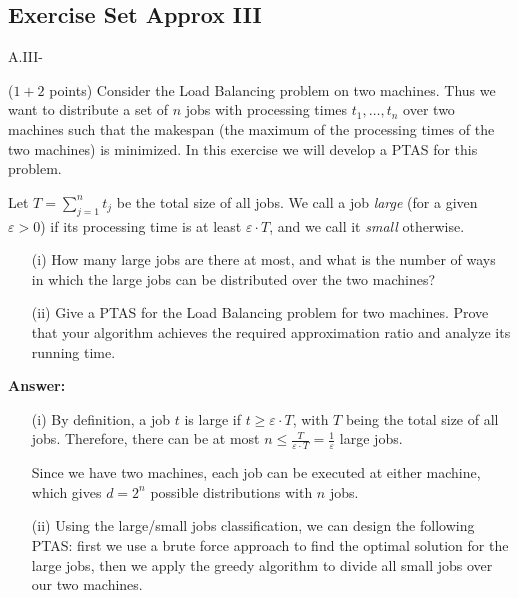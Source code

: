 \documentclass{article}
\newcommand{\loadb}{{\sc Load Balancing}\xspace}
\newcommand{\eps}{\varepsilon}
\renewcommand{\leq}{\leqslant}
\renewcommand{\geq}{\geqslant}
\newcounter{rcounter}
\newenvironment{rlist}%
{\begin{list}{\setnr-\arabic{rcounter}}{\usecounter{rcounter}}}{\end{list}}
\begin{document}
    \renewcommand{\setnr}{A.III}
    \subsection*{Exercise Set Approx III}
    \begin{rlist}
        \item ($1+2$ points)
        Consider the \loadb problem on two machines.  Thus we want to distribute a set of $n$ jobs with processing times $t_1,\ldots,t_n$ over two machines such that the makespan (the maximum of the processing times of the two machines) is minimized. In this exercise we will develop a PTAS for this problem.
        
        Let $T=\sum_{j=1}^n t_j$ be the total size of all jobs. We call a job \emph{large} (for a given $\eps>0$) if its processing time is at least $\eps \cdot T$, and we call it \emph{small} otherwise.
        \begin{enumerate}
            \item[(i)]
            How many large jobs are there at most, and what is the number of ways in which the large jobs can be distributed over the two machines?
            \item[(ii)]
            Give a PTAS for the \loadb problem for two machines. Prove that your algorithm achieves the required approximation ratio and analyze its running time.
        \end{enumerate}
        
        \textbf{Answer:}
        \begin{enumerate}
            \item[(i)]
            By definition, a job $t$ is large if $t \geq \eps \cdot T$, with $T$ being the total size of all jobs. Therefore, there can be at most $n \leq \frac{T}{\eps \cdot T} = \frac{1}{\eps}$ large jobs.
            
            Since we have two machines, each job can be executed at either machine, which gives $d = 2^n$ possible distributions with $n$ jobs.
            \item[(ii)]
            Using the large/small jobs classification, we can design the following PTAS: first we use a brute force approach to find the optimal solution for the large jobs, then we apply the greedy algorithm to divide all small jobs over our two machines.
            

\end{enumerate}
\end{rlist}
\end{document}
